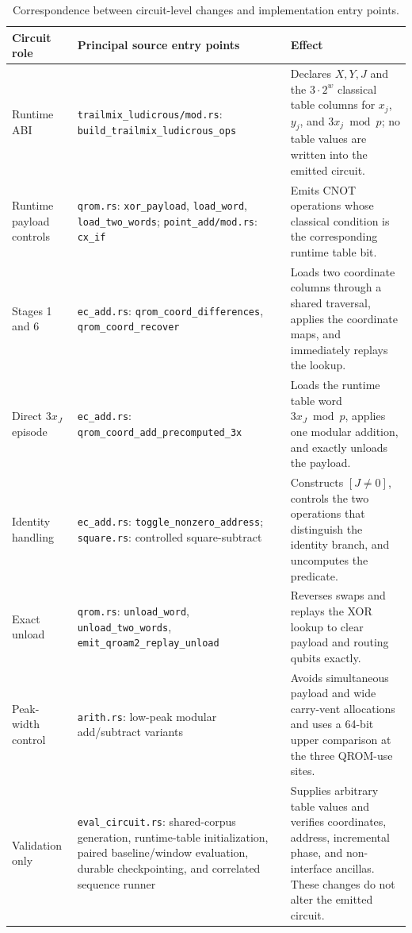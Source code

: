 \documentclass[10pt]{article}
\newcommand{\code}[1]{\texttt{#1}}
\begin{document}
\begin{table}[ht]
\centering
\footnotesize
\begin{tabularx}{\linewidth}{@{}>{\raggedright\arraybackslash}p{2.65cm}>{\raggedright\arraybackslash}p{6.15cm}X@{}}
\toprule
Circuit role & Principal source entry points & Effect \\
\midrule
Runtime ABI & \code{trailmix\_ludicrous/mod.rs}: \code{build\_trailmix\_ludicrous\_ops} & Declares $X,Y,J$ and the $3\cdot2^w$ classical table columns for $x_j$, $y_j$, and $3x_j\bmod p$; no table values are written into the emitted circuit. \\
Runtime payload controls & \code{qrom.rs}: \code{xor\_payload}, \code{load\_word}, \code{load\_two\_words}; \code{point\_add/mod.rs}: \code{cx\_if} & Emits CNOT operations whose classical condition is the corresponding runtime table bit. \\
Stages 1 and 6 & \code{ec\_add.rs}: \code{qrom\_coord\_differences}, \code{qrom\_coord\_recover} & Loads two coordinate columns through a shared traversal, applies the coordinate maps, and immediately replays the lookup. \\
Direct $3x_J$ episode & \code{ec\_add.rs}: \code{qrom\_coord\_add\_precomputed\_3x} & Loads the runtime table word $3x_J\bmod p$, applies one modular addition, and exactly unloads the payload. \\
Identity handling & \code{ec\_add.rs}: \code{toggle\_nonzero\_address}; \code{square.rs}: controlled square-subtract & Constructs $[J\neq0]$, controls the two operations that distinguish the identity branch, and uncomputes the predicate. \\
Exact unload & \code{qrom.rs}: \code{unload\_word}, \code{unload\_two\_words}, \code{emit\_qroam2\_replay\_unload} & Reverses swaps and replays the XOR lookup to clear payload and routing qubits exactly. \\
Peak-width control & \code{arith.rs}: low-peak modular add/subtract variants & Avoids simultaneous payload and wide carry-vent allocations and uses a 64-bit upper comparison at the three QROM-use sites. \\
Validation only & \code{eval\_circuit.rs}: shared-corpus generation, runtime-table initialization, paired baseline/window evaluation, durable checkpointing, and correlated sequence runner & Supplies arbitrary table values and verifies coordinates, address, incremental phase, and non-interface ancillas. These changes do not alter the emitted circuit. \\
\bottomrule
\end{tabularx}
\caption{Correspondence between circuit-level changes and implementation entry points.}
\label{tab:source-map}
\end{table}
\end{document}

